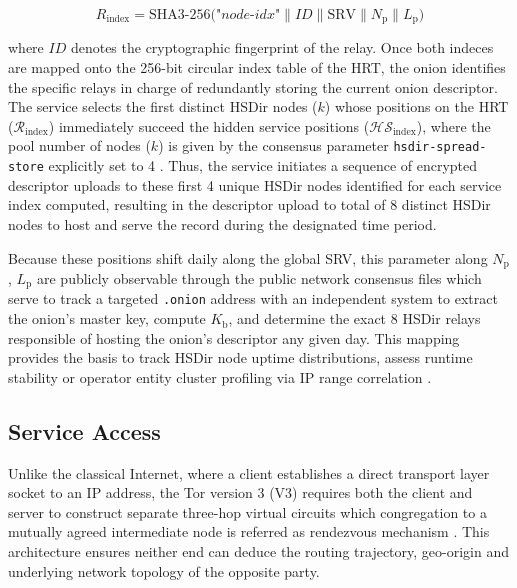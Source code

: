 \documentclass[conference]{IEEEtran}
\begin{document}
\begin{equation}
\textit{R}_{\text{index}} = \text{SHA3-256}\big(\textit{"node-idx"} \parallel \textit{ID} \parallel \text{SRV} \parallel \textit{N}_{\text{p}} \parallel \textit{L}_{\text{p}}\big)
\end{equation}

where $\textit{ID}$ denotes the cryptographic fingerprint of the relay.
Once both indeces are mapped onto the 256-bit circular index table of the HRT, the onion identifies the specific relays in charge of redundantly storing the current onion descriptor. The service selects the first distinct HSDir nodes ($\textit{k}$) whose positions on the HRT 
($\mathcal{R}_{\text{index}}$) immediately succeed the hidden service positions ($\mathcal{HS}_{\text{index}}$), where the pool number of nodes ($\textit{k}$) is given by the consensus parameter \texttt{hsdir-spread-store} explicitly set to 4 \cite{tor_rendspec}. Thus, the service initiates a sequence
of encrypted descriptor uploads to these first 4 unique HSDir nodes identified for each service index computed, resulting in the descriptor upload to total of 8 distinct HSDir nodes to host and serve the record during the designated time period.

Because these positions shift daily along the global SRV, this parameter along $\textit{N}_{\text{p}}$, $\textit{L}_{\text{p}}$ are publicly observable through the public network consensus files which serve to track a targeted \texttt{.onion} address with an independent system
to extract the onion's master key, compute $\textit{K}_{\text{b}}$, and determine the exact 8 HSDir relays responsible of hosting the onion's descriptor any given day. This mapping provides the basis to track HSDir node uptime distributions, assess runtime stability or operator entity
cluster profiling via IP range correlation \cite{winter2016sybil}.

\subsection{Service Access}

Unlike the classical Internet, where a client establishes a direct transport layer socket to an IP address, the Tor version 3 (V3) requires both the client and server to construct separate three-hop virtual circuits which congregation to a mutually agreed intermediate node is referred as
rendezvous mechanism \cite{tor_rendspec, tor_onion_overview}. This architecture ensures neither end can deduce the routing trajectory, geo-origin and underlying network topology of the opposite party. 
\end{document}
